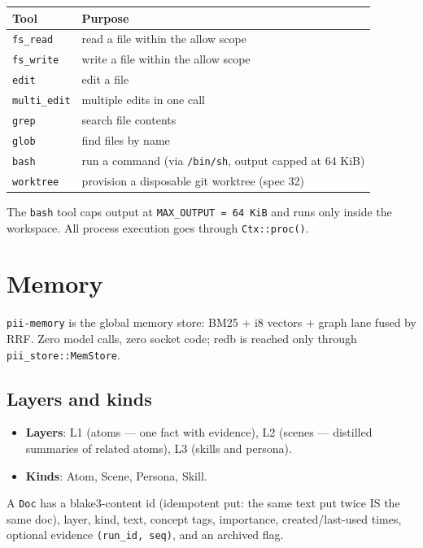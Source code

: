 \documentclass[
	fontsize=10pt,
	twoside=false,
	secnumdepth=2,
	open=any,
]{kaobook}
\begin{document}
\begin{longtable}{@{}ll@{}}
\toprule
\textbf{Tool} & \textbf{Purpose} \\
\midrule
\endhead
\texttt{fs\_read} & read a file within the allow scope \\
\texttt{fs\_write} & write a file within the allow scope \\
\texttt{edit} & edit a file \\
\texttt{multi\_edit} & multiple edits in one call \\
\texttt{grep} & search file contents \\
\texttt{glob} & find files by name \\
\texttt{bash} & run a command (via \texttt{/bin/sh}, output capped at 64 KiB) \\
\texttt{worktree} & provision a disposable git worktree (spec 32) \\
\bottomrule
\end{longtable}

The \texttt{bash} tool caps output at \texttt{MAX\_OUTPUT = 64 KiB} and
runs only inside the workspace. All process execution goes through
\texttt{Ctx::proc()}.

\chapter{Memory}
\label{chap:memory}

\texttt{pii-memory} is the global memory store: BM25 + i8 vectors + graph
lane fused by RRF. Zero model calls, zero socket code; redb is reached
only through \texttt{pii\_store::MemStore}.

\section{Layers and kinds}

\begin{itemize}
    \item \textbf{Layers}: L1 (atoms — one fact with evidence), L2 (scenes
        — distilled summaries of related atoms), L3 (skills and persona).
    \item \textbf{Kinds}: Atom, Scene, Persona, Skill.
\end{itemize}

A \texttt{Doc} has a blake3-content id (idempotent put: the same text put
twice IS the same doc), layer, kind, text, concept tags, importance,
created/last-used times, optional evidence \texttt{(run\_id, seq)}, and an
archived flag.
\end{document}
